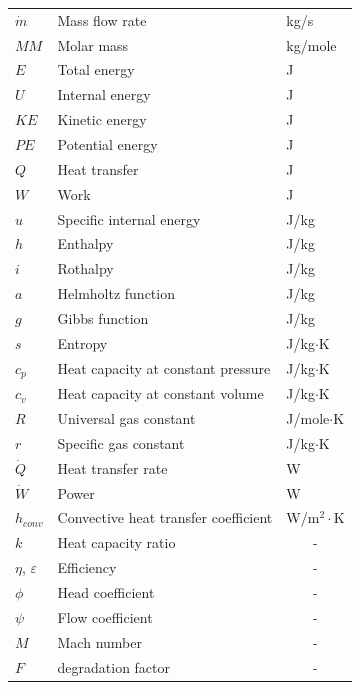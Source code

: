 \documentclass[12pt,a4paper]{report}
\begin{document}
\begin{longtable}[c]{lll}
$\dot{m}$    & Mass flow rate                              & kg/s           \\
$MM$         & Molar mass                                  & kg/mole        \\
$E$          & Total energy                                & J              \\
$U$          & Internal energy                             & J              \\
$KE$         & Kinetic energy                              & J              \\
$PE$         & Potential energy                            & J              \\
$Q$          & Heat transfer                               & J              \\
$W$          & Work                                        & J              \\
$u$          & Specific internal energy                    & J/kg           \\
$h$          & Enthalpy                                    & J/kg           \\
$i$          & Rothalpy                                    & J/kg           \\
$a$          & Helmholtz function                          & J/kg           \\
$g$          & Gibbs function                              & J/kg           \\
$s$          & Entropy                                     & J/kg$\cdot$K   \\
$c_p$        & Heat capacity at constant pressure          & J/kg$\cdot$K   \\
$c_v$        & Heat capacity at constant volume            & J/kg$\cdot$K   \\
$R$          & Universal gas constant                      & J/mole$\cdot$K \\
$r$          & Specific gas constant                       & J/kg$\cdot$K   \\
$\dot{Q}$    & Heat transfer rate                          & W              \\
$\dot{W}$    & Power                                       & W              \\
$h_{conv}$   & Convective heat transfer coefficient        &  W/m$^2\cdot$K \\
$k$          & Heat capacity ratio                         & \multicolumn{1}{c}{-} \\
$\eta$, $\varepsilon$       & Efficiency                   & \multicolumn{1}{c}{-} \\
$\phi$ & Head coefficient                                  & \multicolumn{1}{c}{-} \\
$\psi$ & Flow coefficient                                  & \multicolumn{1}{c}{-} \\
$M$ & Mach number                                          & \multicolumn{1}{c}{-} \\ 
$F$ & degradation factor                                   & \multicolumn{1}{c}{-} \\  
\end{longtable}
\endgroup
  
\end{document}
